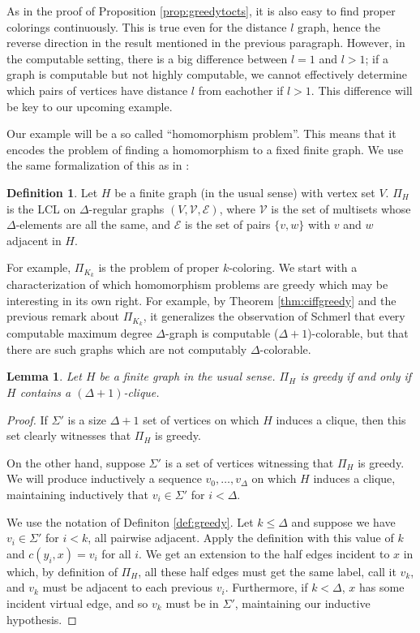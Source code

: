 \documentclass[11pt]{amsart}
\newtheorem{lemma}[theorem]{Lemma}
\theoremstyle{definition}
\newtheorem{definition}[theorem]{Definition}
\begin{document}
As in the proof of Proposition \ref{prop:greedytocts}, it is also easy to find proper colorings continuously. This is true even for the distance $l$ graph, hence the reverse direction in the result mentioned in the previous paragraph. However, in the computable setting, there is a big difference between $l = 1$ and $l > 1$; if a graph is computable but not highly computable, we cannot effectively determine which pairs of vertices have distance $l$ from eachother if $l > 1$. This difference will be key to our upcoming example. 

Our example will be a so called ``homomorphism problem''. This means that it encodes the problem of finding a homomorphism to a fixed finite graph. We use the same formalization of this as in \cite{G+_trees}:

\begin{definition}\label{def:hom}
    Let $H$ be a finite graph (in the usual sense) with vertex set $V$. $\Pi_H$ is the LCL on $\Delta$-regular graphs $(V,\mathcal{V},\mathcal{E})$, where $\mathcal{V}$ is the set of multisets whose $\Delta$-elements are all the same, and $\mathcal{E}$ is the set of pairs $\{v,w\}$ with $v$ and $w$ adjacent in $H$.
\end{definition}

For example, $\Pi_{K_k}$ is the problem of proper $k$-coloring. We start with a characterization of which homomorphism problems are greedy which may be interesting in its own right. For example, by Theorem \ref{thm:ciffgreedy} and the previous remark about $\Pi_{K_k}$, it generalizes the observation of Schmerl \cite{schmerl_brooks} that every computable maximum degree $\Delta$-graph is computable ($\Delta+1$)-colorable, but that there are such graphs which are not computably $\Delta$-colorable.

\begin{lemma}
    Let $H$ be a finite graph in the usual sense. $\Pi_H$ is greedy if and only if $H$ contains a $(\Delta+1)$-clique.
\end{lemma}

\begin{proof}
    If $\Sigma'$ is a size $\Delta+1$ set of vertices on which $H$ induces a clique, then this set clearly witnesses that $\Pi_H$ is greedy.
    
    On the other hand, suppose $\Sigma'$ is a set of vertices witnessing that $\Pi_H$ is greedy. We will produce inductively a sequence $v_0,\ldots,v_{\Delta}$ on which $H$ induces a clique, maintaining inductively that $v_i \in \Sigma'$ for $i < \Delta$. 
    
    We use the notation of Definiton \ref{def:greedy}. Let $k \leq \Delta$ and suppose we have $v_i \in \Sigma'$ for $i < k$, all pairwise adjacent. Apply the definition with this value of $k$ and $c(y_i,x) = v_i$ for all $i$. We get an extension to the half edges incident to $x$ in which, by definition of $\Pi_H$, all these half edges must get the same label, call it $v_k$, and $v_k$ must be adjacent to each previous $v_i$. Furthermore, if $k < \Delta$, $x$ has some incident virtual edge, and so $v_k$ must be in $\Sigma'$, maintaining our inductive hypothesis.
\end{proof}
\end{document}
